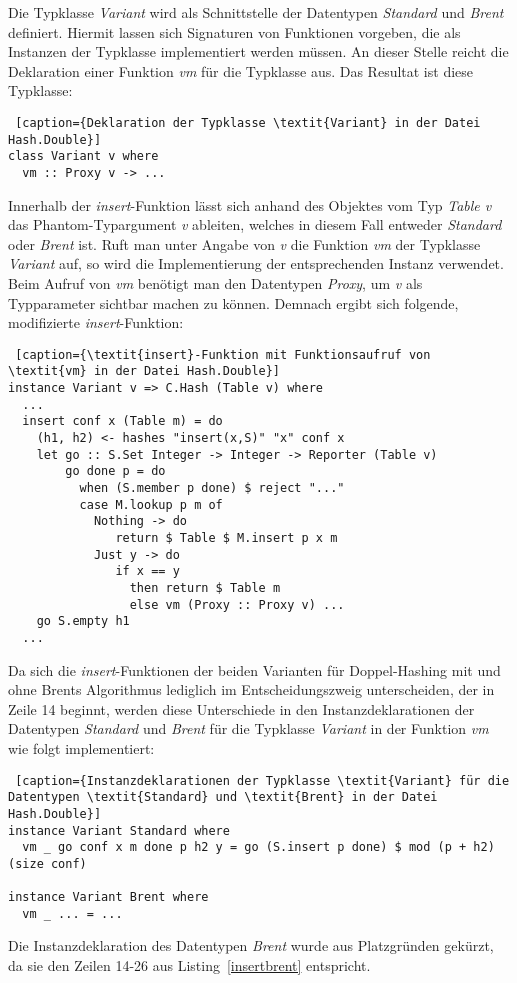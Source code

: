 Die Typklasse \textit{Variant} wird als Schnittstelle der Datentypen \textit{Standard} und \textit{Brent} definiert. Hiermit lassen sich Signaturen von Funktionen vorgeben, die als Instanzen der Typklasse implementiert werden müssen. An dieser Stelle reicht die Deklaration einer Funktion \textit{vm} für die Typklasse aus. Das Resultat ist diese Typklasse:
\begin{lstlisting} [caption={Deklaration der Typklasse \textit{Variant} in der Datei Hash.Double}]
class Variant v where
  vm :: Proxy v -> ...
\end{lstlisting}
Innerhalb der \textit{insert}-Funktion lässt sich anhand des Objektes vom Typ \textit{Table v} das Phantom-Typargument \textit{v} ableiten, welches in diesem Fall entweder \textit{Standard} oder \textit{Brent} ist. Ruft man unter Angabe von \textit{v} die Funktion \textit{vm} der Typklasse \textit{Variant} auf, so wird die Implementierung der entsprechenden Instanz verwendet. Beim Aufruf von \textit{vm} benötigt man den Datentypen \textit{Proxy}, um \textit{v} als Typparameter sichtbar machen zu können. 
\newpage
Demnach ergibt sich folgende, modifizierte \textit{insert}-Funktion:
\begin{lstlisting} [caption={\textit{insert}-Funktion mit Funktionsaufruf von \textit{vm} in der Datei Hash.Double}]
instance Variant v => C.Hash (Table v) where
  ...
  insert conf x (Table m) = do
    (h1, h2) <- hashes "insert(x,S)" "x" conf x
    let go :: S.Set Integer -> Integer -> Reporter (Table v)
        go done p = do
          when (S.member p done) $ reject "..."
          case M.lookup p m of
            Nothing -> do
               return $ Table $ M.insert p x m
            Just y -> do
               if x == y
                 then return $ Table m
                 else vm (Proxy :: Proxy v) ...
    go S.empty h1
  ...  
\end{lstlisting}
Da sich die \textit{insert}-Funktionen der beiden Varianten für Doppel-Hashing mit und ohne Brents Algorithmus lediglich im Entscheidungszweig unterscheiden, der in Zeile 14 beginnt, werden diese Unterschiede in den Instanzdeklarationen der Datentypen \textit{Standard} und \textit{Brent} für die Typklasse \textit{Variant} in der Funktion \textit{vm} wie folgt implementiert: 
\begin{lstlisting} [caption={Instanzdeklarationen der Typklasse \textit{Variant} für die Datentypen \textit{Standard} und \textit{Brent} in der Datei Hash.Double}]
instance Variant Standard where
  vm _ go conf x m done p h2 y = go (S.insert p done) $ mod (p + h2) (size conf)

instance Variant Brent where
  vm _ ... = ...
\end{lstlisting}
Die Instanzdeklaration des Datentypen \textit{Brent} wurde aus Platzgründen gekürzt, da sie den Zeilen 14-26 aus Listing~\ref{insertbrent} entspricht.

